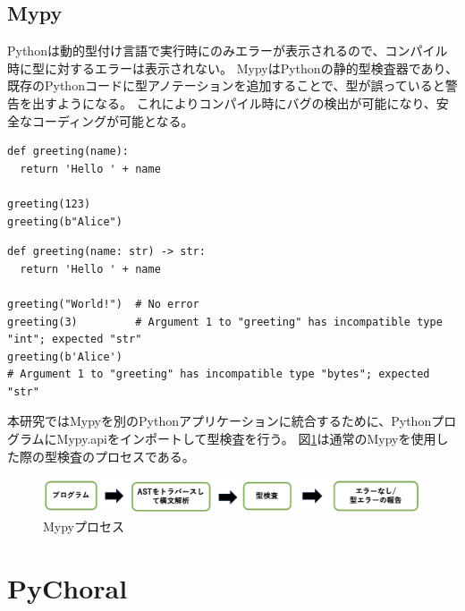\documentclass{thesis}
\begin{document}
\section{Mypy}
Pythonは動的型付け言語で実行時にのみエラーが表示されるので、コンパイル時に型に対するエラーは表示されない。
Mypy\cite{Mypy}はPythonの静的型検査器であり、既存のPythonコードに型アノテーションを追加することで、型が誤っていると警告を出すようになる。
これによりコンパイル時にバグの検出が可能になり、安全なコーディングが可能となる。
\begin{lstlisting}[caption=型注釈のないPythonコード]
def greeting(name):
  return 'Hello ' + name

greeting(123)
greeting(b"Alice")
\end{lstlisting}
\begin{lstlisting}[caption=型注釈のあるPythonコード]
def greeting(name: str) -> str:
  return 'Hello ' + name

greeting("World!")  # No error
greeting(3)         # Argument 1 to "greeting" has incompatible type "int"; expected "str"
greeting(b'Alice')  
# Argument 1 to "greeting" has incompatible type "bytes"; expected "str"
\end{lstlisting}
本研究ではMypyを別のPythonアプリケーションに統合するために、PythonプログラムにMypy.apiをインポートして型検査を行う。
図\ref{mypyproc}は通常のMypyを使用した際の型検査のプロセスである。
\begin{figure}[H]
  \centering
  \includegraphics[scale=0.6]{image/mypyprocess.png}
  \caption{Mypyプロセス}
  \label{mypyproc}
\end{figure}
\chapter{PyChoral}
\end{document}
